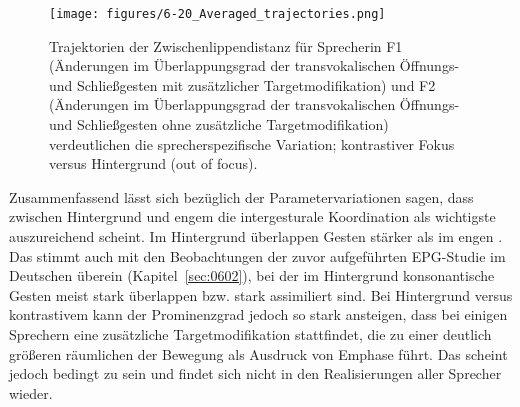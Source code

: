 \begin{figure} 
	\texttt{[image: figures/6-20\_Averaged\_trajectories.png]}
	\caption{Trajektorien der Zwischenlippendistanz für Sprecherin F1 (Änderungen im Überlappungsgrad der transvokalischen Öffnungs- und Schließgesten mit zusätzlicher Targetmodifikation) und F2 (Änderungen im Überlappungsgrad der transvokalischen Öffnungs- und Schließgesten ohne zusätzliche Targetmodifikation) verdeutlichen die sprecherspezifische Variation; kontrastiver Fokus versus Hintergrund (out of focus).}
	\label{figure:0618}
\end{figure}


Zusammenfassend lässt sich bezüglich der Parametervariationen sagen, dass zwischen Hintergrund und engem  die intergesturale Koordination als wichtigste  auszureichend scheint. Im Hintergrund überlappen Gesten stärker als im engen . Das stimmt auch mit den Beobachtungen der zuvor aufgeführten EPG-Studie im Deutschen überein (Kapitel~\ref{sec:0602}), bei der im Hintergrund konsonantische Gesten meist stark überlappen bzw. stark assimiliert sind. Bei Hintergrund versus kontrastivem  kann der Prominenzgrad jedoch so stark ansteigen, dass bei einigen Sprechern eine zusätzliche Targetmodifikation stattfindet, die zu einer deutlich größeren räumlichen  der Bewegung als Ausdruck von Emphase führt. Das scheint jedoch  bedingt zu sein und findet sich nicht in den Realisierungen aller Sprecher wieder.